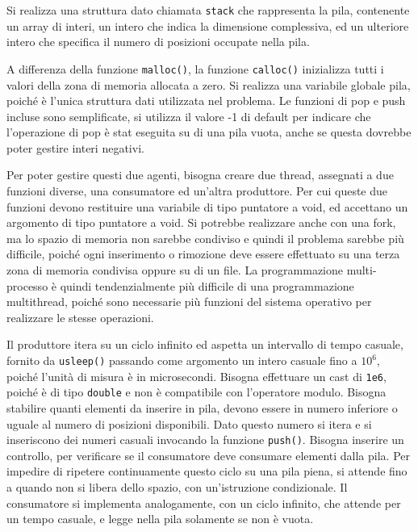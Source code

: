 \documentclass{article}
\numberwithin{equation}{subsection}
\begin{document}
Si realizza una struttura dato chiamata \verb|stack| che rappresenta la pila, 
contenente un array di interi, un intero che indica la dimensione complessiva, ed un 
ulteriore intero che specifica il numero di posizioni occupate nella pila. 


A differenza della funzione \verb|malloc()|, la funzione \verb|calloc()| inizializza 
tutti i valori della zona di memoria allocata a zero. Si realizza una variabile globale 
pila, poiché è l'unica struttura dati utilizzata nel problema. Le funzioni di pop e 
push incluse sono semplificate, si utilizza il valore -1 di default per indicare 
che l'operazione di pop è stat eseguita su di una pila vuota, anche se questa dovrebbe 
poter gestire interi negativi. 

Per poter gestire questi due agenti, bisogna creare due thread, assegnati a due funzioni 
diverse, una consumatore ed un'altra produttore. Per cui queste due funzioni devono 
restituire una variabile di tipo puntatore a void, ed accettano un argomento 
di tipo puntatore a void. 
Si potrebbe realizzare anche con una fork, ma lo spazio di memoria non sarebbe 
condiviso e quindi il problema sarebbe più difficile, poiché ogni inserimento 
o rimozione deve essere effettuato su una terza zona di memoria condivisa 
oppure su di un file. La programmazione multi-processo è quindi 
tendenzialmente più difficile di una programmazione multithread, poiché sono 
necessarie più funzioni del sistema operativo per realizzare le stesse 
operazioni. 

Il produttore itera su un ciclo infinito ed aspetta un intervallo di tempo 
casuale, fornito da \verb|usleep()| passando come argomento un intero 
casuale fino a $10^6$, poiché l'unità di misura è in microsecondi. 
Bisogna effettuare un cast di \verb|1e6|, poiché è di tipo \verb|double| e non 
è compatibile con l'operatore modulo. Bisogna stabilire 
quanti elementi da inserire in pila, devono essere in numero inferiore o uguale 
al numero di posizioni disponibili. Dato questo numero si 
itera e si inseriscono dei numeri casuali invocando la funzione \verb|push()|. 
Bisogna inserire un controllo, per verificare se il consumatore deve consumare 
elementi dalla pila. Per impedire di ripetere continuamente questo ciclo 
su una pila piena, si attende fino a quando non si libera dello spazio, 
con un'istruzione condizionale. 
Il consumatore si implementa analogamente, con un ciclo infinito, che 
attende per un tempo casuale, e legge nella pila solamente se non è vuota. 
\end{document}
